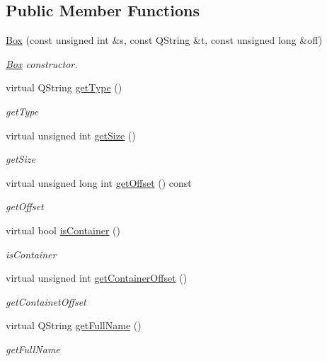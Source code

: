 \subsection*{Public Member Functions}
\begin{DoxyCompactItemize}
\item 
\hyperlink{class_box_a0cce9940febf67fa2e7af70c1884bc0f}{Box} (const unsigned int \&s, const Q\-String \&t, const unsigned long \&off)
\begin{DoxyCompactList}\small\item\em \hyperlink{class_box}{Box} constructor. \end{DoxyCompactList}\item 
virtual Q\-String \hyperlink{class_box_ab349afe9881614148ca93db089ae3723}{get\-Type} ()
\begin{DoxyCompactList}\small\item\em get\-Type \end{DoxyCompactList}\item 
virtual unsigned int \hyperlink{class_box_ae7997ebd366dd92a4f0604bae393ea77}{get\-Size} ()
\begin{DoxyCompactList}\small\item\em get\-Size \end{DoxyCompactList}\item 
virtual unsigned long int \hyperlink{class_box_a3aa52ebe50e92cffe331215c829f0328}{get\-Offset} () const 
\begin{DoxyCompactList}\small\item\em get\-Offset \end{DoxyCompactList}\item 
virtual bool \hyperlink{class_box_aa836717b34b2a26f84b6933d143da42b}{is\-Container} ()
\begin{DoxyCompactList}\small\item\em is\-Container \end{DoxyCompactList}\item 
virtual unsigned int \hyperlink{class_box_a2c9deb5e813bff43a2b2b62aafafe5b6}{get\-Container\-Offset} ()
\begin{DoxyCompactList}\small\item\em get\-Containet\-Offset \end{DoxyCompactList}\item 
virtual Q\-String \hyperlink{class_box_aa7c1e41e425cce53e0bd532cfafbb67d}{get\-Full\-Name} ()
\begin{DoxyCompactList}\small\item\em get\-Full\-Name \end{DoxyCompactList}\item 

\end{DoxyCompactItemize}
